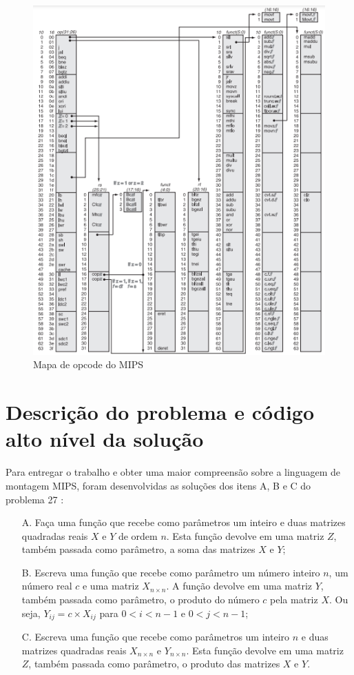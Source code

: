 \documentclass[
	12pt,				%
	oneside,			%
	a4paper,			%
	english,			%
	brazil				%
	]{abntex2ppgsi}
\begin{document}
\begin{figure}[h]
    \centering
    \includegraphics[width=1\linewidth]{opcodes.png}
    \caption{Mapa de opcode do MIPS}
    \label{figOpcode}
\end{figure}

\chapter{Descrição do problema e código alto nível da solução}
Para entregar o trabalho e obter uma maior compreensão sobre a linguagem de montagem MIPS, foram desenvolvidas as soluções dos itens A, B e C do problema 27 \cite{temp1}:

\begin{itemize}
    \item[A.] Faça uma função que recebe como parâmetros um inteiro  e duas matrizes quadradas reais $X$ e $Y$ de ordem $n$. Esta função devolve em uma matriz $Z$, também passada como parâmetro, a soma das matrizes $X$ e $Y$;
    \item[B.] Escreva uma função que recebe como parâmetro um número inteiro $n$, um número real $c$ e uma matriz $X_{n \times n}$. A função devolve em uma matriz $Y$, também passada como parâmetro, o produto do número $c$ pela matriz $X$. Ou seja, $Y_{ij}=c \times X_{ij}$ para $0<i<n-1$ e $0<j<n-1$;
    \item[C.] Escreva uma função que recebe como parâmetros um inteiro $n$ e duas matrizes quadradas reais $X_{n \times n}$ e $Y_{n \times n}$. Esta função devolve em uma matriz $Z$, também passada como parâmetro, o produto das matrizes $X$ e $Y$.
    
\end{itemize}
\end{document}
